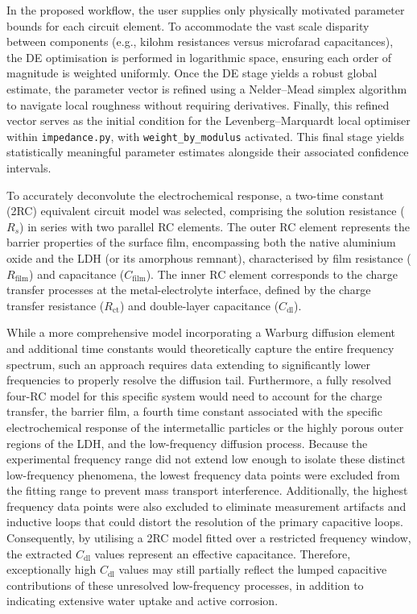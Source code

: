 \documentclass[11pt,twoside,a4paper,final]{report}
\begin{document}
In the proposed workflow, the user supplies only physically motivated parameter bounds for each circuit element. To accommodate the vast scale disparity between components (e.g., kilohm resistances versus microfarad capacitances), the DE optimisation is performed in logarithmic space, ensuring each order of magnitude is weighted uniformly. Once the DE stage yields a robust global estimate, the parameter vector is refined using a Nelder--Mead simplex algorithm to navigate local roughness without requiring derivatives. Finally, this refined vector serves as the initial condition for the Levenberg--Marquardt local optimiser within \texttt{impedance.py}, with \texttt{weight\_by\_modulus} activated. This final stage yields statistically meaningful parameter estimates alongside their associated confidence intervals.

To accurately deconvolute the electrochemical response, a two-time constant (2RC) equivalent circuit model was selected, comprising the solution resistance ($R_s$) in series with two parallel RC elements. The outer RC element represents the barrier properties of the surface film, encompassing both the native aluminium oxide and the LDH (or its amorphous remnant), characterised by film resistance ($R_{\text{film}}$) and capacitance ($C_{\text{film}}$). The inner RC element corresponds to the charge transfer processes at the metal-electrolyte interface, defined by the charge transfer resistance ($R_{\text{ct}}$) and double-layer capacitance ($C_{\text{dl}}$).

While a more comprehensive model incorporating a Warburg diffusion element and additional time constants would theoretically capture the entire frequency spectrum, such an approach requires data extending to significantly lower frequencies to properly resolve the diffusion tail. Furthermore, a fully resolved four-RC model for this specific system would need to account for the charge transfer, the barrier film, a fourth time constant associated with the specific electrochemical response of the intermetallic particles or the highly porous outer regions of the LDH, and the low-frequency diffusion process. Because the experimental frequency range did not extend low enough to isolate these distinct low-frequency phenomena, the lowest frequency data points were excluded from the fitting range to prevent mass transport interference. Additionally, the highest frequency data points were also excluded to eliminate measurement artifacts and inductive loops that could distort the resolution of the primary capacitive loops. Consequently, by utilising a 2RC model fitted over a restricted frequency window, the extracted $C_{\text{dl}}$ values represent an effective capacitance. Therefore, exceptionally high $C_{\text{dl}}$ values may still partially reflect the lumped capacitive contributions of these unresolved low-frequency processes, in addition to indicating extensive water uptake and active corrosion.
\end{document}
